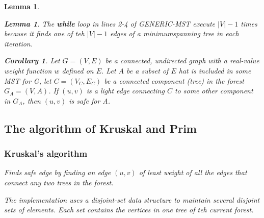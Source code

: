 \documentclass[a4paper,11pt]{book}
\newtheorem{lemma}[theorem]{Lemma}
\newtheorem{corollary}[theorem]{Corollary}
\begin{document}
{\begin{lemma}
\begin{lemma}
The \textbf{while} loop in lines 2-4 of GENERIC-MST execute $|V|-1$ times because it finds one of teh $|V|-1$ edges of a minimumspanning tree in each iteration.

\begin{corollary}
Let $G=(V,E)$ be a connected, undirected graph with a real-value weight function $w$ defined on $E$. Let $A$ be a subset of $E$ hat is included in some MST for G, let $C=(V_C,E_C)$ be a connected component (tree) in the forest $G_A = (V,A)$. If $(u,v)$ is a light edge connecting $C$ to some other component in $G_A$, then $(u, v)$ is safe for A.
\end{corollary}
\subsection{The algorithm of Kruskal and Prim}
\subsubsection{Kruskal's algorithm}
Finds safe edge by finding an edge $(u,v)$ of least weight of all the edges that connect any two trees in the forest.

The implementation uses a disjoint-set data structure to maintain several disjoint sets of elements. Each set contains the vertices in one tree of teh current forest.


\end{lemma}
\end{lemma}}
\end{document}
